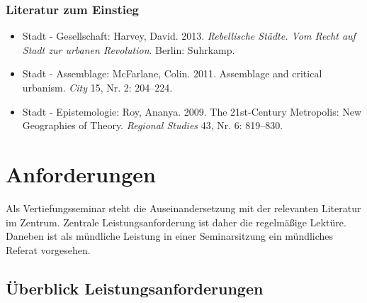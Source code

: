 \documentclass[
  ngerman,
]{article}
\providecommand{\tightlist}{%
  \setlength{\itemsep}{0pt}\setlength{\parskip}{0pt}}
\begin{document}
\hypertarget{literatur-zum-einstieg}{%
\subsubsection*{Literatur zum Einstieg}\label{literatur-zum-einstieg}}

\begin{itemize}
\tightlist
\item
  Stadt - Gesellschaft: Harvey, David. 2013. \emph{Rebellische Städte. Vom Recht auf Stadt zur urbanen Revolution}. Berlin: Suhrkamp.
\item
  Stadt - Assemblage: McFarlane, Colin. 2011. Assemblage and critical urbanism. \emph{City} 15, Nr. 2: 204--224.
\item
  Stadt - Epistemologie: Roy, Ananya. 2009. The 21st-Century Metropolis: New Geographies of Theory. \emph{Regional Studies} 43, Nr. 6: 819--830.
\end{itemize}

\hypertarget{anforderungen}{%
\section*{Anforderungen}\label{anforderungen}}

Als Vertiefungsseminar steht die Auseinandersetzung mit der relevanten Literatur im Zentrum. Zentrale Leistungsanforderung ist daher die regelmäßige Lektüre. Daneben ist als mündliche Leistung in einer Seminarsitzung ein mündliches Referat vorgesehen.

\hypertarget{uxfcberblick-leistungsanforderungen}{%
\subsection*{Überblick Leistungsanforderungen}\label{uxfcberblick-leistungsanforderungen}}
\end{document}
